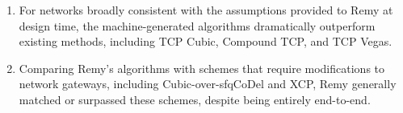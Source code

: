 \begin{enumerate}

\item For networks broadly consistent with the assumptions provided to
  Remy at design time, the machine-generated algorithms dramatically
  outperform existing methods, including TCP Cubic, Compound TCP, and
  TCP Vegas.

\item Comparing Remy's algorithms with schemes that require
  modifications to network gateways, including Cubic-over-sfqCoDel and
  XCP, Remy generally matched or surpassed these schemes, despite
  being entirely end-to-end.
\end{enumerate}





